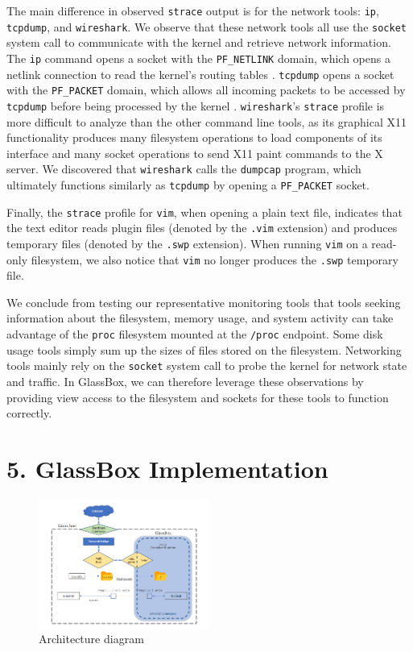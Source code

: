 \documentclass{proc}
\begin{document}
The main difference in observed \texttt{strace} output is for the network tools: \texttt{ip}, \texttt{tcpdump}, and \texttt{wireshark}. We observe that these network tools all use the \texttt{socket} system call to communicate with the kernel and retrieve network information. The \texttt{ip} command opens a socket with the \texttt{PF\_NETLINK} domain, which opens a netlink connection to read the kernel's routing tables \cite{rtnetlinkman}. \texttt{tcpdump} opens a socket with the \texttt{PF\_PACKET} domain, which allows all incoming packets to be accessed by \texttt{tcpdump} before being processed by the kernel \cite{packetman}. \texttt{wireshark}'s \texttt{strace} profile is more difficult to analyze than the other command line tools, as its graphical X11 functionality produces many filesystem operations to load components of its interface and many socket operations to send X11 paint commands to the X server. We discovered that \texttt{wireshark} calls the \texttt{dumpcap} program, which ultimately functions similarly as \texttt{tcpdump} by opening a \texttt{PF\_PACKET} socket.

Finally, the \texttt{strace} profile for \texttt{vim}, when opening a plain text file, indicates that the text editor reads plugin files (denoted by the \texttt{.vim} extension) and produces temporary files (denoted by the \texttt{.swp} extension). When running \texttt{vim} on a read-only filesystem, we also notice that \texttt{vim} no longer produces the \texttt{.swp} temporary file.

We conclude from testing our representative monitoring tools that tools seeking information about the filesystem, memory usage, and system activity can take advantage of the \texttt{proc} filesystem mounted at the \texttt{/proc} endpoint. Some disk usage tools simply sum up the sizes of files stored on the filesystem. Networking tools mainly rely on the \texttt{socket} system call to probe the kernel for network state and traffic. In GlassBox, we can therefore leverage these observations by providing view access to the filesystem and sockets for these tools to function correctly.

\section*{5. GlassBox Implementation}

\begin{figure}
\includegraphics[width=0.5\textwidth]{architecture}
\caption{Architecture diagram}
\end{figure}
\end{document}
